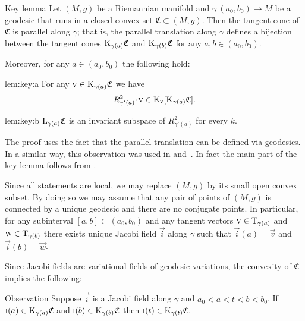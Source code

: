 \documentclass[a4paper,10pt]{article}
\begin{document}
\begin{thm}{Key lemma}\label{lem:key}
Let $(M,g)$ be a Riemannian manifold and $\gamma\:(a_0,b_0)\to M$ be a geodesic that runs in a closed convex set $\mathfrak{C}\subset (M,g)$.
Then the tangent cone of $\mathfrak{C}$ is parallel along $\gamma$; that is, the parallel translation along $\gamma$ defines a bijection between the tangent cones $\mathrm{K}_{\gamma(a)}\mathfrak{C}$ and $\mathrm{K}_{\gamma(b)}\mathfrak{C}$ for any $a,b \in (a_0,b_0)$.

Moreover, for any $a\in (a_0,b_0)$ the following hold:
\begin{subthm}{lem:key:a}
For any $\text{\sc{v}}\in \mathrm{K}_{\gamma(a)}\mathfrak{C}$ we have
\[R^2_{\gamma'(a)}\cdot \vec{v}\in \K_\vec{v}[\K_{\gamma(a)}\mathfrak{C}].\]
\end{subthm}

\begin{subthm}{lem:key:b} 
$\mathrm{L}_{\gamma(a)}\mathfrak{C}$ is an invariant subspace of $R^2_{\gamma'(a)}$ for every $k$.
\end{subthm}

\end{thm}

The proof uses the fact that the parallel translation can be defined via geodesics.
In a similar way, this observation was used in \cite[Section 13]{Ber-Nik} and~\cite{Petruninpar}.
In fact the main part of the key lemma follows from
\cite{Petruninpar}.

Since all statements are local, we may replace $(M,g)$ by its small open convex subset.
By doing so we may assume that any pair of points of $(M,g)$ is connected by a unique geodesic and there are no conjugate points.
In particular, for any subinterval $[a,b]\subset (a_0,b_0)$ and any tangent vectors $\text{\sc{v}} \in \mathrm{T}_{\gamma (a)}$ and $\text{\sc{w}} \in \mathrm{T}_{\gamma (b)}$ there exists unique Jacobi field $\vec{i}$ along $\gamma$ 
such that $\vec{i}(a)=\vec{v}$ and $\vec{i}(b)=\vec{w}$.

Since Jacobi fields are variational fields of geodesic variations, 
the convexity of $\mathfrak{C}$ implies the following: 

\begin{thm}{Observation}
Suppose $\vec{i}$ is a Jacobi field along %
$\gamma$ and $a_0<a<t<b<b_0$.
If 
$\text{\sc{i}}(a)\in \mathrm{K}_{\gamma(a)}\mathfrak{C}$ and $\text{\sc{i}}(b)\in \mathrm{K}_{\gamma(b)}\mathfrak{C}$
then $\text{\sc{i}}(t)\in \mathrm{K}_{\gamma(t)}\mathfrak{C}$.
\end{thm}%
\end{document}
